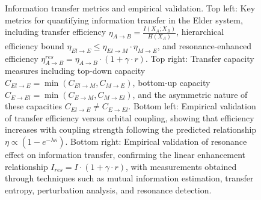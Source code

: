 \begin{figure}[t]
\caption{Information transfer metrics and empirical validation. Top left: Key metrics for quantifying information transfer in the Elder system, including transfer efficiency $\eta_{A \to B} = \frac{I(X_A; X_B)}{H(X_A)}$, hierarchical efficiency bound $\eta_{El \to E} \leq \eta_{El \to M} \cdot \eta_{M \to E}$, and resonance-enhanced efficiency $\eta_{A \to B}^{res} = \eta_{A \to B} \cdot (1 + \gamma \cdot r)$. Top right: Transfer capacity measures including top-down capacity $C_{El \to E} = \min(C_{El \to M}, C_{M \to E})$, bottom-up capacity $C_{E \to El} = \min(C_{E \to M}, C_{M \to El})$, and the asymmetric nature of these capacities $C_{El \to E} \neq C_{E \to El}$. Bottom left: Empirical validation of transfer efficiency versus orbital coupling, showing that efficiency increases with coupling strength following the predicted relationship $\eta \propto (1 - e^{-\lambda \kappa})$. Bottom right: Empirical validation of resonance effect on information transfer, confirming the linear enhancement relationship $I_{res} = I \cdot (1 + \gamma \cdot r)$, with measurements obtained through techniques such as mutual information estimation, transfer entropy, perturbation analysis, and resonance detection.}
\label{fig:transfer_metrics}
\end{figure}